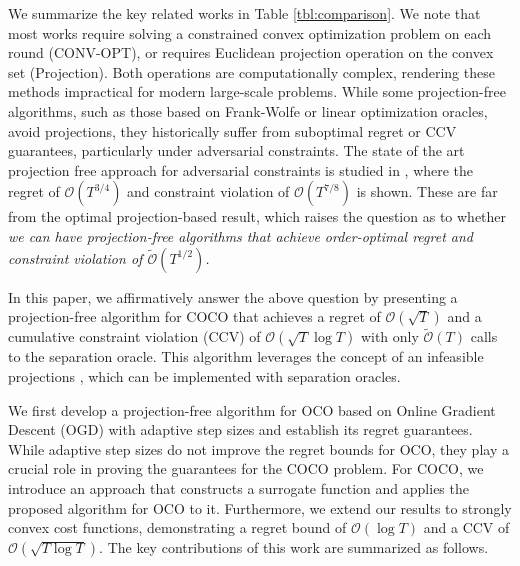 \documentclass[twoside,11pt,]{article}
\newcommand{\C}[1]{\mathcal{#1}}
\renewcommand{\cite}[1]{\citep{#1}}
\begin{document}
We summarize the key related works in Table \ref{tbl:comparison}. We note  that most works require solving a constrained convex
optimization problem on each round (CONV-OPT), or requires Euclidean projection operation on the convex set (Projection). Both operations are computationally complex, rendering these methods impractical for modern large-scale problems. While some projection-free algorithms, such as those based on Frank-Wolfe or linear optimization oracles, avoid projections, they historically suffer from suboptimal regret or CCV guarantees, particularly under adversarial constraints. The state of the art projection free approach for adversarial constraints is studied in \cite{garber2024projection}, where the regret of $\C{O}(T^{3/4})$ and constraint violation of $\C{O}(T^{7/8})$ is shown. These are far from the optimal projection-based result, which raises the question as to whether {\it we can have projection-free algorithms that achieve order-optimal regret and constraint violation of $\tilde{\C{O}}(T^{1/2})$.}


In this paper, we affirmatively answer the above question by presenting a projection-free algorithm for COCO that achieves a regret of \(\mathcal{O}(\sqrt{T})\) and a cumulative constraint violation (CCV) of \(\mathcal{O}(\sqrt{T} \log T)\) with only \(\tilde{\mathcal{O}}({T})\) calls to the separation oracle. This algorithm leverages the concept of an infeasible projections \cite{garber2022new, garber2024projection, pedramfar2024linearizable}, which can be implemented with separation oracles.   

We first develop a projection-free algorithm for OCO based on Online Gradient Descent (OGD) with adaptive step sizes and establish its regret guarantees. While adaptive step sizes do not improve the regret bounds for OCO, they play a crucial role in proving the guarantees for the COCO problem. For COCO, we introduce an approach that constructs a surrogate function and applies the proposed  algorithm for OCO to it.  Furthermore, we extend our results to strongly convex cost functions, demonstrating a regret bound of \(\mathcal{O}(\log T)\) and a CCV of \(\mathcal{O}(\sqrt{T \log T})\). The key contributions of this work are summarized as follows.
\end{document}
